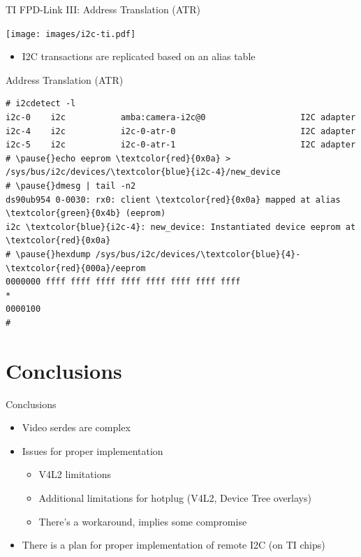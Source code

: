 \documentclass[xetex,table,aspectratio=169]{beamer}
\begin{document}
\begin{frame}{TI FPD-Link III: Address Translation (ATR)}
  \begin{center}
    \texttt{[image: images/i2c-ti.pdf]}
  \end{center}

  \begin{itemize}
  \item I2C transactions are replicated based on an alias table
  \end{itemize}
\end{frame}

\begin{frame}[fragile]{Address Translation (ATR)}
  \begin{Verbatim}[commandchars=\\\{\}]
# i2cdetect -l
i2c-0    i2c           amba:camera-i2c@0                   I2C adapter
i2c-4    i2c           i2c-0-atr-0                         I2C adapter
i2c-5    i2c           i2c-0-atr-1                         I2C adapter
# \pause{}echo eeprom \textcolor{red}{0x0a} > /sys/bus/i2c/devices/\textcolor{blue}{i2c-4}/new_device
# \pause{}dmesg | tail -n2
ds90ub954 0-0030: rx0: client \textcolor{red}{0x0a} mapped at alias \textcolor{green}{0x4b} (eeprom)
i2c \textcolor{blue}{i2c-4}: new_device: Instantiated device eeprom at \textcolor{red}{0x0a}
# \pause{}hexdump /sys/bus/i2c/devices/\textcolor{blue}{4}-\textcolor{red}{000a}/eeprom
0000000 ffff ffff ffff ffff ffff ffff ffff ffff
*
0000100
#
  \end{Verbatim}
\end{frame}


\section{Conclusions}

\begin{frame}{Conclusions}
  \begin{itemize}
  \item Video serdes are complex
  \item Issues for proper implementation
    \begin{itemize}
    \item V4L2 limitations
    \item Additional limitations for hotplug (V4L2, Device Tree overlays)
    \item There's a workaround, implies some compromise
    \end{itemize}
  \item There is a plan for proper implementation of remote I2C (on TI chips)
  \end{itemize}
\end{frame}
\end{document}
